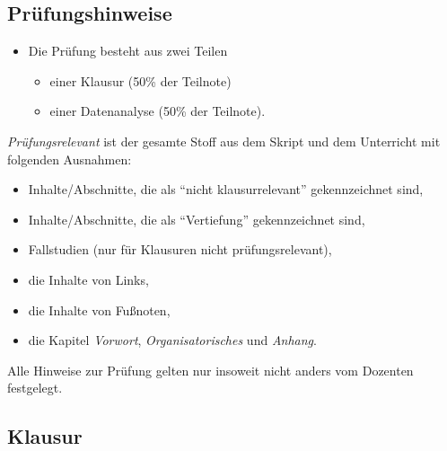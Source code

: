 \documentclass[12pt,ngerman,]{book}
\providecommand{\tightlist}{%
  \setlength{\itemsep}{0pt}\setlength{\parskip}{0pt}}
\theoremstyle{definition}
\theoremstyle{definition}
\theoremstyle{remark}
\begin{document}
\subsection{Prüfungshinweise}\label{prufungshinweise}

\begin{itemize}
\tightlist
\item
  Die Prüfung besteht aus zwei Teilen

  \begin{itemize}
  \tightlist
  \item
    einer Klausur (50\% der Teilnote)
  \item
    einer Datenanalyse (50\% der Teilnote).
  \end{itemize}
\end{itemize}

\emph{Prüfungsrelevant} ist der gesamte Stoff aus dem Skript und dem
Unterricht mit folgenden Ausnahmen:

\begin{itemize}
\tightlist
\item
  Inhalte/Abschnitte, die als ``nicht klausurrelevant'' gekennzeichnet
  sind,
\item
  Inhalte/Abschnitte, die als ``Vertiefung'' gekennzeichnet sind,
\item
  Fallstudien (nur für Klausuren nicht prüfungsrelevant),
\item
  die Inhalte von Links,
\item
  die Inhalte von Fußnoten,
\item
  die Kapitel \emph{Vorwort}, \emph{Organisatorisches} und
  \emph{Anhang}.
\end{itemize}

Alle Hinweise zur Prüfung gelten nur insoweit nicht anders vom Dozenten
festgelegt.

\subsection{Klausur}\label{klausur}
\end{document}
